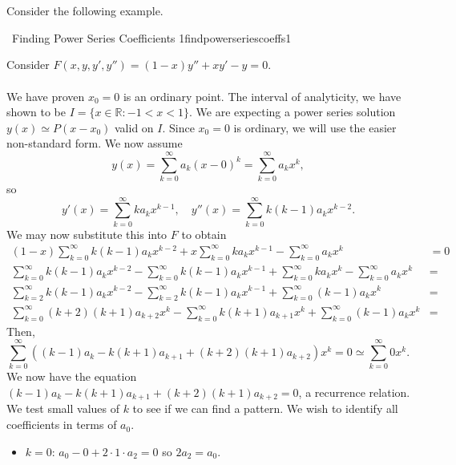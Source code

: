     \pagebreak
    \vphantom
    \\
    \\
    Consider the following example.
    \begin{example}{\Difficulty\,\Difficulty\,\,Finding Power Series Coefficients 1}{findpowerseriescoeffs1}

        Consider \(F(x,y,y',y'')=(1-x)y''+xy'-y=0\).
        \\
        \\
        We have proven \(x_0=0\) is an ordinary point. The interval of analyticity, we have shown to be \(I=\{x\in\mathbb{R}:-1<x<1\}\). We are expecting a power series solution \(y(x)\simeq P(x-x_0)\) valid on \(I\). Since \(x_0=0\) is ordinary, we will use the easier non-standard form. We now assume
        \begin{equation*}
            y(x)=\sum_{k=0}^\infty a_k(x-0)^k=\sum_{k=0}^\infty a_kx^k,
        \end{equation*}
        so
        \begin{equation*}
            y'(x)=\sum_{k=0}^\infty ka_kx^{k-1},\quad y''(x)=\sum_{k=0}^\infty k(k-1)a_kx^{k-2}.
        \end{equation*}
        We may now substitute this into \(F\) to obtain
        \begin{align*}
            (1-x)\sum_{k=0}^\infty k(k-1)a_kx^{k-2}+x\sum_{k=0}^\infty ka_kx^{k-1}-\sum_{k=0}^\infty a_kx^k&=0 \\
            \sum_{k=0}^\infty k(k-1)a_kx^{k-2}-\sum_{k=0}^\infty k(k-1)a_kx^{k-1}+\sum_{k=0}^\infty ka_kx^k-\sum_{k=0}^\infty a_kx^k&= \\
            \sum_{k=2}^\infty k(k-1)a_kx^{k-2}-\sum_{k=2}^\infty k(k-1)a_kx^{k-1}+\sum_{k=0}^\infty (k-1)a_kx^k&= \\
            \sum_{k=0}^\infty (k+2)(k+1)a_{k+2}x^k-\sum_{k=0}^\infty k(k+1)a_{k+1}x^k+\sum_{k=0}^\infty (k-1)a_kx^k&=
        \end{align*}
        Then,
        \begin{equation*}
            \sum_{k=0}^\infty ((k-1)a_k-k(k+1)a_{k+1}+(k+2)(k+1)a_{k+2})x^k=0\simeq\sum_{k=0}^\infty 0x^k.
        \end{equation*}
        We now have the equation \((k-1)a_k-k(k+1)a_{k+1}+(k+2)(k+1)a_{k+2}=0\), a recurrence relation. We test small values of \(k\) to see if we can find a pattern. We wish to identify all coefficients in terms of \(a_0\).
        \begin{itemize}
            \item \(k=0\): \(a_0-0+2\cdot1\cdot a_2=0\) so \(2a_2=a_0\).

\end{itemize}
\end{example}
